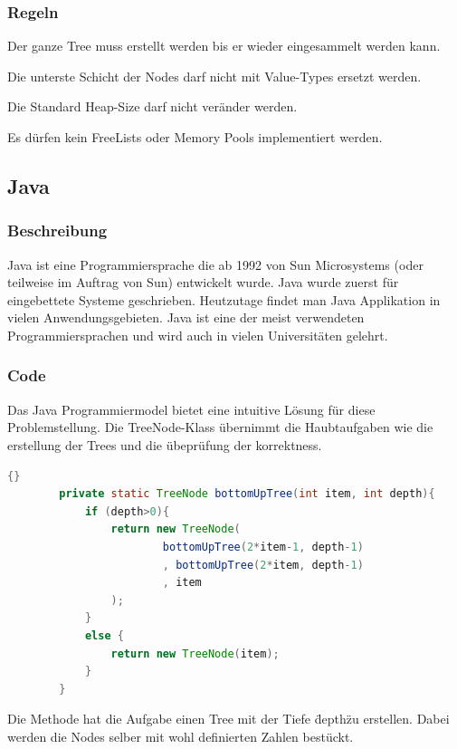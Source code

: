 \documentclass{fancydocument}
\begin{document}
\subsubsection{Regeln}

\item Der ganze Tree muss erstellt werden bis er wieder eingesammelt
  werden kann.
\item Die unterste Schicht der Nodes darf nicht mit Value-Types
  ersetzt werden.
\item Die Standard Heap-Size darf nicht ver\"ander werden.
\item Es d\"urfen kein FreeLists oder Memory Pools implementiert werden.


\subsection{Java}
\subsubsection{Beschreibung}

Java ist eine Programmiersprache die ab 1992 von Sun Microsystems (oder
teilweise im Auftrag von Sun) entwickelt wurde. Java wurde zuerst f\"ur
eingebettete Systeme geschrieben. Heutzutage findet man Java Applikation in
vielen Anwendungsgebieten.
Java ist eine der meist verwendeten Programmiersprachen und wird auch
in vielen Universitäten gelehrt. 

\subsubsection{Code}

Das Java Programmiermodel bietet eine  intuitive L\"osung f\"ur diese
Problemstellung. Die TreeNode-Klass \"ubernimmt die Haubtaufgaben wie
die erstellung der Trees und die \"ubepr\"ufung der korrektness.
\\
\begin{lstlisting}[language=java,caption=Tree erstelung]{}
		private static TreeNode bottomUpTree(int item, int depth){
			if (depth>0){
				return new TreeNode(
						bottomUpTree(2*item-1, depth-1)
						, bottomUpTree(2*item, depth-1)
						, item
				);
			}
			else {
				return new TreeNode(item);
			}
		}
\end{lstlisting}
		
Die Methode hat die Aufgabe einen Tree mit der Tiefe \"depth\" zu
erstellen. Dabei werden die Nodes selber mit wohl definierten Zahlen best\"uckt. 
\end{document}
